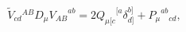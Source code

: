 \begin{equation}
\tilde{V}_{cd}{}^{AB}D_{\mu}{V_{AB}}^{ab}=2{Q_{\mu [c}}^{[a}\delta_{d]}^{b]}
+ {P_{\mu}}^{ab}{}_{cd},
\end{equation}

